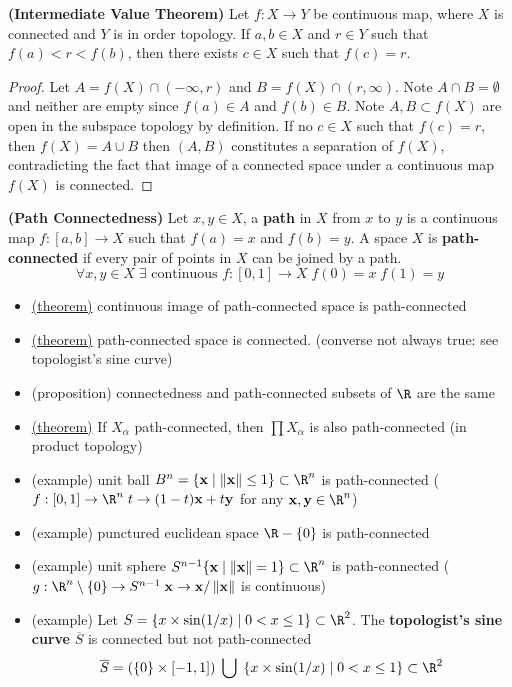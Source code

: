 \documentclass[10.5pt]{article}
\newcommand{\bx}{\mathbf{x}}
\newcommand{\by}{\mathbf{y}}
\renewcommand{\norm}[1]{\left\lVert#1\right\rVert}
\begin{document}
\begin{theorem*}
    \textbf{(Intermediate Value Theorem)} Let $f:X\to Y$ be continuous map, where $X$ is connected and $Y$ is in order topology. If $a,b \in X$ and $r\in Y$ such that $f(a) <  r < f(b)$, then there exists $c\in X$ such that $f(c) = r$.
    \begin{proof}
        Let $A = f(X) \cap (-\infty, r)$ and $B = f(X) \cap (r, \infty)$. Note $A\cap B=\emptyset$ and neither are empty since $f(a)\in A$ and $f(b)\in B$. Note $A,B \subset f(X)$ are open in the subspace topology by definition. If no $c\in X$ such that $f(c) = r$, then $f(X) = A \cup B$ then $(A,B)$ constitutes a separation of $f(X)$, contradicting the fact that image of a connected space under a continuous map $f(X)$ is connected.
    \end{proof}
\end{theorem*}

\begin{defn*}
    \textbf{(Path Connectedness)} Let $x,y\in X$, a \textbf{path} in $X$ from $x$ to $y$ is a continuous map $f:[a,b] \to X$ such that $f(a) = x$ and $f(b) = y$. A space $X$ is \textbf{path-connected} if every pair of points in $X$ can be joined by a path.
    \[
        \forall x,y\in X \; \exists \text{ continuous } f:[0,1] \to X \; f(0)=x \; f(1)=y
    \]
    \begin{itemize}
        \item \underline{(theorem)} continuous image of path-connected space is path-connected
        \item \underline{(theorem)} path-connected space is connected. (converse not always true: see topologist's sine curve)
        \item (proposition) connectedness and path-connected subsets of $\R$ are the same
        \item \underline{(theorem)} If $X_{\alpha}$ path-connected, then $\textstyle \prod X_{\alpha}$ is also path-connected (in product topology) 
        \item (example) unit ball $B^n = \{\bx \mid \norm{\bx} \leq 1 \} \subset \R^n$ is path-connected ($f:[0,1]\to \R^n \; t \to (1-t)\bx + t\by$ for any $\bx,\by \in \R^n$)
        \item (example) punctured euclidean space $\R - \{0\}$ is path-connected
        \item (example) unit sphere $S^{n-1} \{\bx \mid \norm{\bx} = 1\} \subset \R^n$ is path-connected ($g: \R^n \setminus \{0\} \to S^{n-1} \; \bx \to \bx / \norm{\bx}$ is continuous)
        \item (example) Let $S = \{x\times \sin (1/x) \mid 0 < x \leq 1 \} \subset \R^2$. The \textbf{topologist's sine curve} $\overline{S}$ is connected but not path-connected
        \[
            \overline{S} = \left(\{0\} \times [-1,1]\right) \;\bigcup\; \left\{x\times \sin (1/x) \mid 0 < x \leq 1 \right\} \subset \R^2
        \]
    \end{itemize}
\end{defn*}
\end{document}
